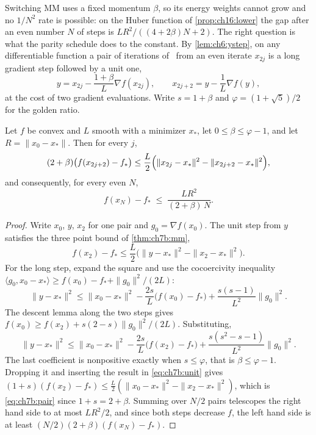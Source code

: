 Switching MM uses a fixed momentum $\beta$, so its energy weights cannot grow
and no $1/N^2$ rate is possible: on the Huber function of \cref{prop:ch16:lower} the gap after an even number $N$ of steps is $LR^2/((4+2\beta)N+2)$. The right question is what the parity
schedule does to the constant. By \cref{lem:ch6:ystep}, on any differentiable
function a pair of iterations of \smmdet\ from an even iterate $x_{2j}$ is a
long gradient step followed by a unit one,
\[
  y=x_{2j}-\frac{1+\beta}{L}\nabla f(x_{2j}),\qquad x_{2j+2}=y-\frac1L\nabla f(y),
\]
at the cost of two gradient evaluations. Write $s=1+\beta$ and
$\varphi=(1+\sqrt5)/2$ for the golden ratio.

\begin{theorem}\label{thm:ch7b:smmrate}
Let $f$ be convex and $L$ smooth with a minimizer $x_*$, let
$0\le\beta\le\varphi-1$, and let $R=\|x_0-x_*\|$. Then for every $j$,
\begin{equation}\label{eq:ch7b:pair}
  (2+\beta)\bigl(f(x_{2j+2})-f_*\bigr)\le\frac L2\Bigl(\|x_{2j}-x_*\|^2-\|x_{2j+2}-x_*\|^2\Bigr),
\end{equation}
and consequently, for every even $N$,
\[
  f(x_N)-f_*\;\le\;\frac{LR^2}{(2+\beta)\,N}.
\]
\end{theorem}

\begin{proof}
Write $x_0$, $y$, $x_2$ for one pair and $g_0=\nabla f(x_0)$. The unit step
from $y$ satisfies the three point bound of \cref{thm:ch7b:mm},
\begin{equation}\label{eq:ch7b:unit}
  f(x_2)-f_*\le\frac L2\bigl(\|y-x_*\|^2-\|x_2-x_*\|^2\bigr).
\end{equation}
For the long step, expand the square and use the cocoercivity inequality
$\langle g_0,x_0-x_*\rangle\ge f(x_0)-f_*+\|g_0\|^2/(2L)$:
\[
  \|y-x_*\|^2\le\|x_0-x_*\|^2-\frac{2s}L\bigl(f(x_0)-f_*\bigr)+\frac{s(s-1)}{L^2}\|g_0\|^2.
\]
The descent lemma along the two steps gives
$f(x_0)\ge f(x_2)+s(2-s)\|g_0\|^2/(2L)$. Substituting,
\[
  \|y-x_*\|^2\le\|x_0-x_*\|^2-\frac{2s}L\bigl(f(x_2)-f_*\bigr)+\frac{s(s^2-s-1)}{L^2}\|g_0\|^2.
\]
The last coefficient is nonpositive exactly when $s\le\varphi$, that is
$\beta\le\varphi-1$. Dropping it and inserting the result in \eqref{eq:ch7b:unit}
gives $(1+s)(f(x_2)-f_*)\le\frac L2(\|x_0-x_*\|^2-\|x_2-x_*\|^2)$, which is
\eqref{eq:ch7b:pair} since $1+s=2+\beta$. Summing over $N/2$ pairs telescopes
the right hand side to at most $LR^2/2$, and since both steps decrease $f$, the
left hand side is at least $(N/2)(2+\beta)(f(x_N)-f_*)$.
\end{proof}


